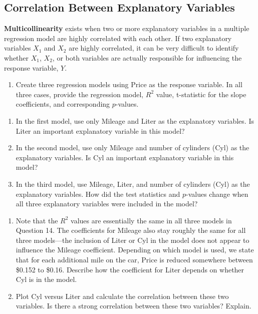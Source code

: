 \documentclass[
]{report}
\providecommand{\tightlist}{%
  \setlength{\itemsep}{0pt}\setlength{\parskip}{0pt}}
\begin{document}
\subsection*{Correlation Between Explanatory Variables}\label{correlation-between-explanatory-variables}

\textbf{Multicollinearity} exists when two or more explanatory variables in a multiple regression model are highly correlated with each other. If two explanatory variables \(X_1\) and \(X_2\) are highly correlated, it can be very difficult to identify whether \(X_1\), \(X_2\), or both variables are actually responsible for influencing the response variable, \(Y\).

\begin{enumerate}
\def\labelenumi{\arabic{enumi}.}
\setcounter{enumi}{13}
\tightlist
\item
  Create three regression models using Price as the response variable. In all three cases, provide the regression model, \(R^2\) value, t-statistic for the slope coefficients, and corresponding \(p\)-values.
\end{enumerate}

\begin{enumerate}
\def\labelenumi{\alph{enumi}.}
\tightlist
\item
  In the first model, use only Mileage and Liter as the explanatory variables. Is Liter an important explanatory variable in this model?
\item
  In the second model, use only Mileage and number of cylinders (Cyl) as the explanatory variables. Is Cyl an important explanatory variable in this model?
\item
  In the third model, use Mileage, Liter, and number of cylinders (Cyl) as the explanatory variables. How did the test statistics and \(p\)-values change when all three explanatory variables were included in the model?
\end{enumerate}

\begin{enumerate}
\def\labelenumi{\arabic{enumi}.}
\setcounter{enumi}{14}
\item
  Note that the \(R^2\) values are essentially the same in all three models in Question 14. The coefficients for Mileage also stay roughly the same for all three models---the inclusion of Liter or Cyl in the model does not appear to influence the Mileage coefficient. Depending on which model is used, we state that for each additional mile on the car, Price is reduced somewhere between \$0.152 to \$0.16. Describe how the coefficient for Liter depends on whether Cyl is in the model.
\item
  Plot Cyl versus Liter and calculate the correlation between these two variables. Is there a strong correlation between these two variables? Explain.
\end{enumerate}
\end{document}
